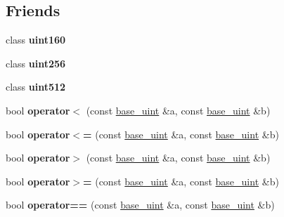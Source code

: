 \subsection*{Friends}
\begin{DoxyCompactItemize}
\item 
\mbox{\label{classbase__uint_a62f39eeba719002b6e74dac4d4bfdcb2}} 
class {\bfseries uint160}
\item 
\mbox{\label{classbase__uint_ab1083249be3f13e76af62a1727c376a4}} 
class {\bfseries uint256}
\item 
\mbox{\label{classbase__uint_af77c23ebaa42f59c901cd04630ff38ee}} 
class {\bfseries uint512}
\item 
\mbox{\label{classbase__uint_a89272b5112f90ba683c0f066ba1426c1}} 
bool {\bfseries operator$<$} (const \mbox{\hyperlink{classbase__uint}{base\+\_\+uint}} \&a, const \mbox{\hyperlink{classbase__uint}{base\+\_\+uint}} \&b)
\item 
\mbox{\label{classbase__uint_ac7f1bdba7208bd852f7b00f7c49624f8}} 
bool {\bfseries operator$<$=} (const \mbox{\hyperlink{classbase__uint}{base\+\_\+uint}} \&a, const \mbox{\hyperlink{classbase__uint}{base\+\_\+uint}} \&b)
\item 
\mbox{\label{classbase__uint_ac59719bd052d5dc2afcc35ae4a8843ab}} 
bool {\bfseries operator$>$} (const \mbox{\hyperlink{classbase__uint}{base\+\_\+uint}} \&a, const \mbox{\hyperlink{classbase__uint}{base\+\_\+uint}} \&b)
\item 
\mbox{\label{classbase__uint_a9eb243df5a6dfa3d0cd326427d99bfa6}} 
bool {\bfseries operator$>$=} (const \mbox{\hyperlink{classbase__uint}{base\+\_\+uint}} \&a, const \mbox{\hyperlink{classbase__uint}{base\+\_\+uint}} \&b)
\item 
\mbox{\label{classbase__uint_aafca305decdfd2ded4688213ab4a55fa}} 
bool {\bfseries operator==} (const \mbox{\hyperlink{classbase__uint}{base\+\_\+uint}} \&a, const \mbox{\hyperlink{classbase__uint}{base\+\_\+uint}} \&b)
\item 
\mbox{\label{classbase__uint_a977dbbe7e78bbdcc2aea2dc16292d424}} 

\end{DoxyCompactItemize}
